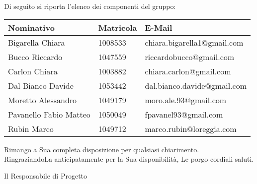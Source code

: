 \documentclass{letter}
\begin{document}
\begin{letter}{}
	Di seguito si riporta l'elenco dei componenti del gruppo:
	\begin{center}
		\begin{tabu}{|p{4cm}|p{2.5cm}|p{5cm}|}
		\hline
			\rowfont{\bf}
			\textbf{Nominativo} & \textbf{Matricola} & \textbf{E-Mail} \\ \hline
			Bigarella Chiara & 1008533 & chiara.bigarella1@gmail.com \\ \hline
			Bucco Riccardo & 1047559 & riccardobucco@gmail.com \\ \hline
			Carlon Chiara & 1003882 & chiara.carlon@gmail.com \\ \hline
			Dal Bianco Davide & 1053442 & dal.bianco.davide@gmail.com \\ \hline
			Moretto Alessandro & 1049179 & moro.ale.93@gmail.com \\ \hline
			Pavanello Fabio Matteo & 1050049 & fpavanel93@gmail.com \\ \hline
			Rubin Marco & 1049712 & marco.rubin@loreggia.com \\ \hline
		\end{tabu}
	\end{center}

	Rimango a Sua completa disposizione per qualsiasi chiarimento.\\
	RingraziandoLa anticipatamente per la Sua disponibilità, Le porgo cordiali saluti.
	
	\closing{
		Il Responsabile di Progetto \\ [1cm]
		 \\
	}

\end{letter}
\end{document}
